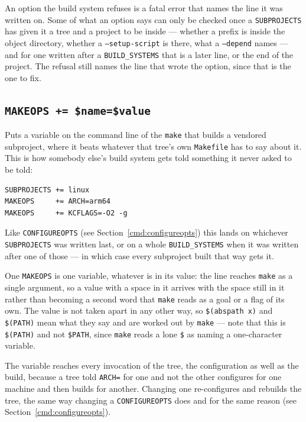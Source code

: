 \documentclass{article}
\begin{document}
An option the build system refuses is a fatal error that names the
line it was written on.  Some of what an option says can only be
checked once a \texttt{SUBPROJECTS} has given it a tree and a project
to be inside --- whether a prefix is inside the object directory,
whether a \texttt{--setup-script} is there, what a \texttt{--depend}
names --- and for one written after a \texttt{BUILD\_SYSTEMS} that is
a later line, or the end of the project.  The refusal still names the
line that wrote the option, since that is the one to fix.

\subsection{\texttt{MAKEOPS += \$name=\$value} \label{cmd:makeops}}

Puts a variable on the command line of the \texttt{make} that builds a
vendored subproject, where it beats whatever that tree's own
\texttt{Makefile} has to say about it.  This is how somebody else's
build system gets told something it never asked to be told:

\begin{verbatim}
SUBPROJECTS += linux
MAKEOPS     += ARCH=arm64
MAKEOPS     += KCFLAGS=-O2 -g
\end{verbatim}

Like \texttt{CONFIGUREOPTS} (see Section~\ref{cmd:configureopts}) this
lands on whichever \texttt{SUBPROJECTS} was written last, or on a whole
\texttt{BUILD\_SYSTEMS} when it was written after one of those --- in
which case every subproject built that way gets it.

One \texttt{MAKEOPS} is one variable, whatever is in its value: the
line reaches \texttt{make} as a single argument, so a value with a
space in it arrives with the space still in it rather than becoming a
second word that \texttt{make} reads as a goal or a flag of its own.
The value is not taken apart in any other way, so
\texttt{\$(abspath x)} and \texttt{\$(PATH)} mean what they say and
are worked out by \texttt{make} --- note that this is
\texttt{\$(PATH)} and not \texttt{\$PATH}, since \texttt{make} reads
a lone \texttt{\$} as naming a one-character variable.

The variable reaches every invocation of the tree, the configuration
as well as the build, because a tree told \texttt{ARCH=} for one and
not the other configures for one machine and then builds for another.
Changing one re-configures and rebuilds the tree, the same way
changing a \texttt{CONFIGUREOPTS} does and for the same reason (see
Section~\ref{cmd:configureopts}).
\end{document}
